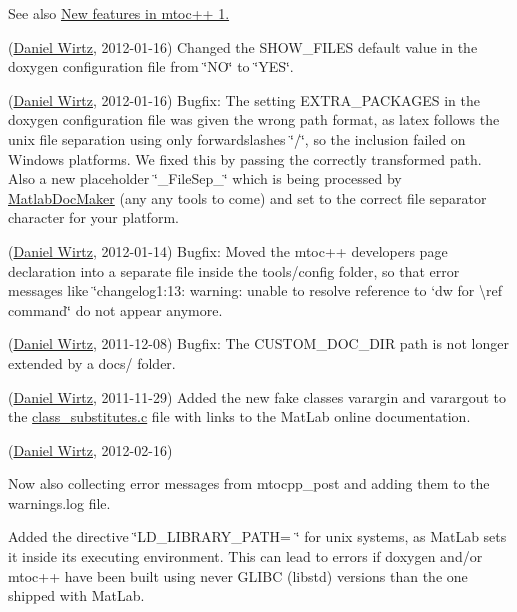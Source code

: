 See also \hyperlink{newfeat1_3}{New features in mtoc++ 1.}


\begin{DoxyRefList}
\item[\label{changelog1_3__changelog1_3000021}%
\hypertarget{changelog1_3__changelog1_3000021}{}%
Page \hyperlink{changes}{Changes and new features in mtoc++} ](\hyperlink{developers_dw}{Daniel Wirtz}, 2012-\/01-\/16) Changed the {\ttfamily S\+H\+O\+W\+\_\+\+F\+I\+L\+E\+S} default value in the doxygen configuration file from \char`\"{}\+N\+O\char`\"{} to \char`\"{}\+Y\+E\+S\char`\"{}.

(\hyperlink{developers_dw}{Daniel Wirtz}, 2012-\/01-\/16) Bugfix\+: The setting {\ttfamily E\+X\+T\+R\+A\+\_\+\+P\+A\+C\+K\+A\+G\+E\+S} in the doxygen configuration file was given the wrong path format, as latex follows the unix file separation using only forwardslashes \char`\"{}/\char`\"{}, so the inclusion failed on Windows platforms. We fixed this by passing the correctly transformed path. Also a new placeholder \char`\"{}\+\_\+\+File\+Sep\+\_\+\char`\"{} which is being processed by \hyperlink{class_matlab_doc_maker}{Matlab\+Doc\+Maker} (any any tools to come) and set to the correct file separator character for your platform.

(\hyperlink{developers_dw}{Daniel Wirtz}, 2012-\/01-\/14) Bugfix\+: Moved the mtoc++ developers page declaration into a separate file inside the tools/config folder, so that error messages like \char`\"{}changelog1\+:13\+: warning\+: unable to resolve reference to
 `dw\textquotesingle{} for \textbackslash{}ref command\char`\"{} do not appear anymore.

(\hyperlink{developers_dw}{Daniel Wirtz}, 2011-\/12-\/08) Bugfix\+: The C\+U\+S\+T\+O\+M\+\_\+\+D\+O\+C\+\_\+\+D\+I\+R path is not longer extended by a {\ttfamily docs/} folder.

(\hyperlink{developers_dw}{Daniel Wirtz}, 2011-\/11-\/29) Added the new fake classes varargin and varargout to the \hyperlink{class__substitutes_8c_source}{class\+\_\+substitutes.\+c} file with links to the Mat\+Lab online documentation. 
\item[\label{changelog1_3__changelog1_3000001}%
\hypertarget{changelog1_3__changelog1_3000001}{}%
Class \hyperlink{class_matlab_doc_maker}{Matlab\+Doc\+Maker} ](\hyperlink{developers_dw}{Daniel Wirtz}, 2012-\/02-\/16)
\begin{DoxyItemize}
\item Now also collecting error messages from mtocpp\+\_\+post and adding them to the warnings.\+log file.
\item Added the directive \char`\"{}\+L\+D\+\_\+\+L\+I\+B\+R\+A\+R\+Y\+\_\+\+P\+A\+T\+H= \char`\"{} for unix systems, as Mat\+Lab sets it inside its executing environment. This can lead to errors if doxygen and/or mtoc++ have been built using never G\+L\+I\+B\+C (libstd) versions than the one shipped with Mat\+Lab.
\end{DoxyItemize}


\end{DoxyRefList}
